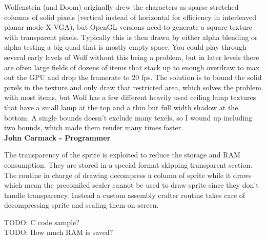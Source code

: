 \begin{fancyquotes}
Wolfenstein (and Doom) originally drew the characters as sparse stretched columns of solid pixels (vertical instead of horizontal for efficiency in interleaved planar mode-X VGA), but OpenGL versions need to generate a square texture with transparent pixels.  Typically this is then drawn by either alpha blending or alpha testing a big quad that is mostly empty space.  You could play through several early levels of Wolf without this being a problem, but in later levels there are often large fields of dozens of items that stack up to enough overdraw to max out the GPU and drop the framerate to 20 fps.  The solution is to bound the solid pixels in the texture and only draw that restricted area, which solves the problem with most items, but Wolf has a few different heavily used ceiling lamp textures that have a small lamp at the top and a thin but full width shadow at the bottom.  A single bounds doesn't exclude many texels, so I wound up including two bounds, which made them render many times faster. 
\bigskip \\
\textbf{John Carmack - Programmer}
 \end{fancyquotes}

\par

The transparency of the sprite is exploited to reduce the storage and RAM consumption. They are stored in a special format skipping transparent section. The routine in charge of drawing decompress a column of sprite while it draws which mean the precomiled scaler cannot be used to draw sprite since they don't handle transparency. Instead a custom assembly crafter routine takes care of decompressing sprite and scaling them on screen.
\par
TODO: C code sample?\\
TODO: How much RAM is saved?\\















